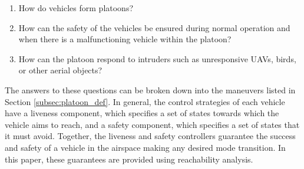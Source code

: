 \begin{enumerate}
\item How do vehicles form platoons?
\item How can the safety of the vehicles be ensured during normal operation and when there is a malfunctioning vehicle within the platoon?
\item How can the platoon respond to intruders such as unresponsive UAVs, birds, or other aerial objects?
\end{enumerate}

The answers to these questions can be broken down into the maneuvers listed in Section \ref{subsec:platoon_def}. In general, the control strategies of each vehicle have a liveness component, which specifies a set of states towards which the vehicle aims to reach, and a safety component, which specifies a set of states that it must avoid. Together, the liveness and safety controllers guarantee the success and safety of a vehicle in the airspace making any desired mode transition. In this paper, these guarantees are provided using reachability analysis.

